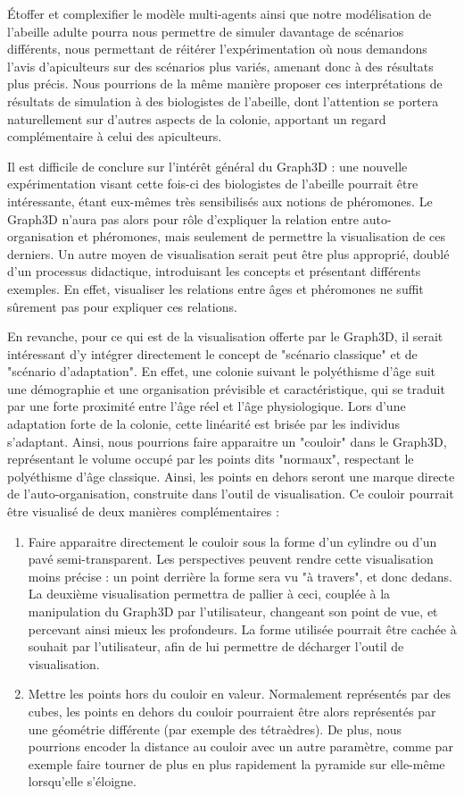	Étoffer et complexifier le modèle multi-agents ainsi que notre modélisation de l'abeille adulte pourra nous permettre de simuler davantage de scénarios différents, nous permettant de réitérer l'expérimentation où nous demandons l'avis d'apiculteurs sur des scénarios plus variés, amenant donc à des résultats plus précis. Nous pourrions de la même manière proposer ces interprétations de résultats de simulation à des biologistes de l'abeille, dont l'attention se portera naturellement sur d'autres aspects de la colonie, apportant un regard complémentaire à celui des apiculteurs.

Il est difficile de conclure sur l'intérêt général du Graph3D : une nouvelle expérimentation visant cette fois-ci des biologistes de l'abeille pourrait être intéressante, étant eux-mêmes très sensibilisés aux notions de phéromones. Le Graph3D n'aura pas alors pour rôle d'expliquer la relation entre auto-organisation et phéromones, mais seulement de permettre la visualisation de ces derniers. Un autre moyen de visualisation serait peut être plus approprié, doublé d'un processus didactique, introduisant les concepts et présentant différents exemples. En effet, visualiser les relations entre âges et phéromones ne suffit sûrement pas pour expliquer ces relations.

	En revanche, pour ce qui est de la visualisation offerte par le Graph3D, il serait intéressant d'y intégrer directement le concept de "scénario classique" et de "scénario d'adaptation". En effet, une colonie suivant le polyéthisme d'âge suit une démographie et une organisation prévisible et caractéristique, qui se traduit par une forte proximité entre l'âge réel et l'âge physiologique. Lors d'une adaptation forte de la colonie, cette linéarité est brisée par les individus s'adaptant. Ainsi, nous pourrions faire apparaitre un "couloir" dans le Graph3D, représentant le volume occupé par les points dits "normaux", respectant le polyéthisme d'âge classique. Ainsi, les points en dehors seront une marque directe de l'auto-organisation, construite dans l'outil de visualisation. Ce couloir pourrait être visualisé de deux manières complémentaires :
	\begin{enumerate}
		\item Faire apparaitre directement le couloir sous la forme d'un cylindre ou d'un pavé semi-transparent. Les perspectives peuvent rendre cette visualisation moins précise : un point derrière la forme sera vu "à travers", et donc dedans. La deuxième visualisation permettra de pallier à ceci, couplée à la manipulation du Graph3D par l'utilisateur, changeant son point de vue, et percevant ainsi mieux les profondeurs. La forme utilisée pourrait être cachée à souhait par l'utilisateur, afin de lui permettre de décharger l'outil de visualisation.
		\item Mettre les points hors du couloir en valeur. Normalement représentés par des cubes, les points en dehors du couloir pourraient être alors représentés par une géométrie différente (par exemple des tétraèdres). De plus, nous pourrions encoder la distance au couloir avec un autre paramètre, comme par exemple faire tourner de plus en plus rapidement la pyramide sur elle-même lorsqu'elle s'éloigne.
	\end{enumerate}
	
